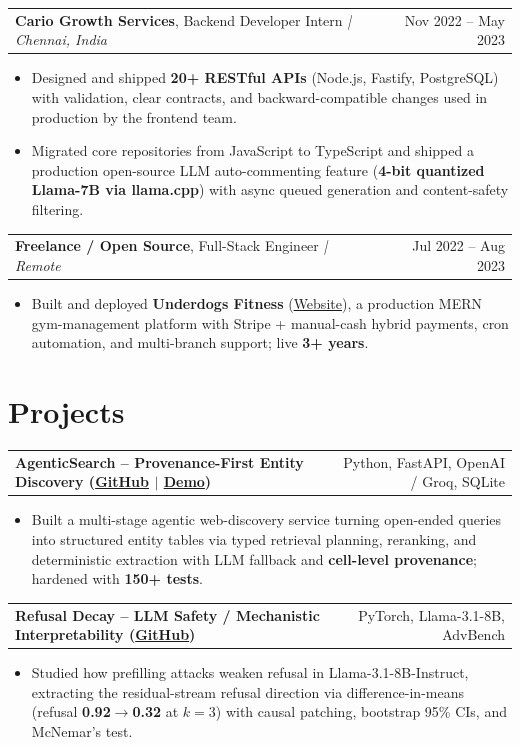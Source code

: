 \documentclass[letterpaper,11pt]{article}
\makeatletter
\newcommand{\expItem}[4]{%
  \vspace{3pt}
  \begin{tabular*}{\textwidth}{@{}l@{\extracolsep{\fill}}r@{}}
    \textbf{#1}, #2 \textit{| #3} & #4 \\
  \end{tabular*}\par\vspace{-2pt}
}
\newcommand{\projItem}[2]{%
  \vspace{6pt}
  \begin{tabular*}{\textwidth}{@{}l@{\extracolsep{\fill}}r@{}}
    \textbf{#1} & #2 \\
  \end{tabular*}\par\vspace{-2pt}
}
\makeatother
\begin{document}
\expItem{Cario Growth Services}{Backend Developer Intern}{Chennai, India}{Nov 2022 -- May 2023}
\begin{itemize}
  \item Designed and shipped \textbf{20+ RESTful APIs} (Node.js, Fastify, PostgreSQL) with validation, clear contracts, and backward-compatible changes used in production by the frontend team.
  \item Migrated core repositories from JavaScript to TypeScript and shipped a production open-source LLM auto-commenting feature (\textbf{4-bit quantized Llama-7B via llama.cpp}) with async queued generation and content-safety filtering.
\end{itemize}

\expItem{Freelance / Open Source}{Full-Stack Engineer}{Remote}{Jul 2022 -- Aug 2023}
\begin{itemize}
  \item Built and deployed \textbf{Underdogs Fitness} (\href{https://www.underdogsfitness.in/}{Website}), a production MERN gym-management platform with Stripe + manual-cash hybrid payments, cron automation, and multi-branch support; live \textbf{3+ years}.
\end{itemize}

\section{Projects}

\projItem{AgenticSearch -- Provenance-First Entity Discovery {\normalfont\small(\href{https://github.com/Deva-1903/ciir_agentic_search}{GitHub} $\vert$ \href{https://agentic-search-negglszkwa-uc.a.run.app}{Demo})}}{Python, FastAPI, OpenAI / Groq, SQLite}
\begin{itemize}
  \item Built a multi-stage agentic web-discovery service turning open-ended queries into structured entity tables via typed retrieval planning, reranking, and deterministic extraction with LLM fallback and \textbf{cell-level provenance}; hardened with \textbf{150+ tests}.
\end{itemize}

\projItem{Refusal Decay -- LLM Safety / Mechanistic Interpretability {\normalfont\small(\href{https://github.com/Deva-1903/refusal-decay}{GitHub})}}{PyTorch, Llama-3.1-8B, AdvBench}
\begin{itemize}
  \item Studied how prefilling attacks weaken refusal in Llama-3.1-8B-Instruct, extracting the residual-stream refusal direction via difference-in-means (refusal \textbf{0.92$\to$0.32} at $k{=}3$) with causal patching, bootstrap 95\% CIs, and McNemar's test.
\end{itemize}
\end{document}
